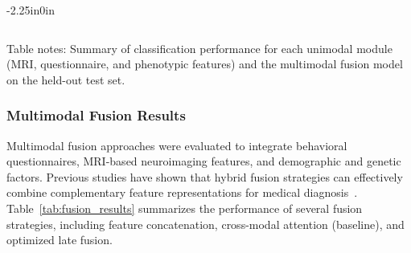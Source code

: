\documentclass[10pt,letterpaper]{article}
\begin{document}
\begin{table}[!t]
\begin{adjustwidth}{-2.25in}{0in}
\begin{tabular}{|p{3.0cm}|p{2.0cm}|p{2.0cm}|p{2.0cm}|p{2.0cm}|p{2.0cm}|}
                                                                                                                          \end{tabular}

                                                                                                                          \begin{flushleft}
                                                                                                                          Table notes: Summary of classification performance for each unimodal module
                                                                                                                          (MRI, questionnaire, and phenotypic features) and the multimodal fusion
                                                                                                                          model on the held-out test set.
                                                                                                                          \end{flushleft}

                                                                                                                          \end{adjustwidth}
                                                                                                                          \end{table}

                                                                                                                          \subsubsection*{Multimodal Fusion Results}
                                                        Multimodal fusion approaches were evaluated to integrate behavioral questionnaires, MRI-based neuroimaging features, and demographic and genetic factors. Previous studies have shown that hybrid fusion strategies can effectively combine complementary feature representations for medical diagnosis~\cite{ref65}.                      
                                                                                                                          Table~\ref{tab:fusion_results} summarizes the performance
                                                                                                                          of several fusion strategies, including feature concatenation,
                                                                                                                          cross-modal attention (baseline), and optimized late fusion.
\end{document}
